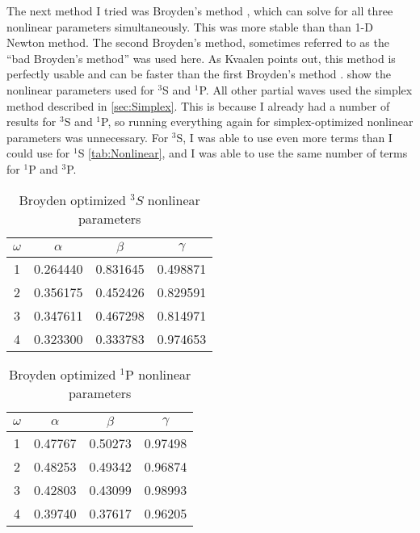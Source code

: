 \documentclass[Dissertation.tex]{subfiles}
\begin{document}
The next method I tried was Broyden's method \cite{Sauer2006}, which can 
solve for all three nonlinear parameters simultaneously. This was more stable 
than than 1-D Newton method. The second Broyden's method, sometimes referred 
to as the ``bad Broyden's method'' was used here. As Kvaalen points out, this 
method is perfectly usable and can be faster than the first Broyden's method 
\cite{Kvaalen1991}. 
show the nonlinear parameters used for $^3$S and $^1$P. All other partial waves
used the simplex method described in \cref{sec:Simplex}. This is because I
already had a number of results for $^3$S and $^1$P, so running everything
again for simplex-optimized nonlinear parameters was unnecessary. For $^3$S,
I was able to use even more terms than I could use for $^1$S \cref{tab:Nonlinear},
and I was able to use the same number of terms for $^1$P and $^3$P.

\setlength{\abovecaptionskip}{6pt}   %
\setlength{\belowcaptionskip}{6pt}   %
\begin{table}
\centering
\begin{tabular}{c c c c}
\toprule
$\omega$ & $\alpha$ & $\beta$ & $\gamma$ \\ [0.5ex]
\midrule
1 & 0.264440 & 0.831645 & 0.498871 \\
2 & 0.356175 & 0.452426 & 0.829591 \\
3 & 0.347611 & 0.467298 & 0.814971 \\
4 & 0.323300 & 0.333783 & 0.974653 \\
\bottomrule
\end{tabular}
\caption{Broyden optimized $^3S$ nonlinear parameters}
\label{tab:NonlinearOptimized3SBroyden}
\end{table}


\begin{table}
\centering
\begin{tabular}{c c c c}
\toprule
$\omega$ & $\alpha$ & $\beta$ & $\gamma$ \\ [0.5ex]
\midrule
1 & 0.47767 & 0.50273 & 0.97498 \\
2 & 0.48253 & 0.49342 & 0.96874 \\
3 & 0.42803 & 0.43099 & 0.98993 \\
4 & 0.39740 & 0.37617 & 0.96205 \\
\bottomrule
\end{tabular}
\caption{Broyden optimized $^1$P nonlinear parameters}
\label{tab:BroydenPWaveSingOpt}
\end{table}
\end{document}
